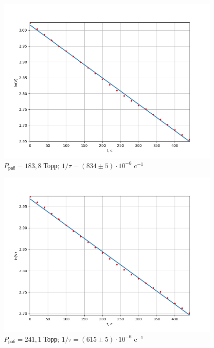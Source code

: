 \documentclass[12pt]{article}
\begin{document}
\begin{figure}[H]
	\centering
	\includegraphics[scale = 0.695]{./images/Gr3.png}
	\caption{$P_\text{раб} = 183,8$ Торр;  $1/\tau = (834 \pm 5) \cdot 10^{-6}$ c$^{-1}$}
	\label{fig:Gr3}
\end{figure}

\begin{figure}[H]
	\centering
	\includegraphics[scale = 0.695]{./images/Gr4.png}
	\caption{$P_\text{раб} = 241,1$ Торр;  $1/\tau = (615 \pm 5) \cdot 10^{-6}$ c$^{-1}$}
	\label{fig:Gr4}
\end{figure}
\end{document}
